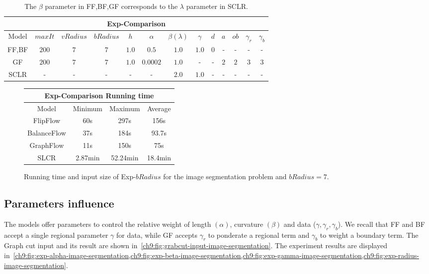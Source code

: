 \begin{table}
\small
\centering
\begin{tabular}{|c|c|c|c|c|c|c|c|c|c|c|c|c|}
\hline
\multicolumn{13}{|c|}{Exp-Comparison}\\
\hline
Model & $maxIt$ & $vRadius$ & $bRadius$ & $h$ & $\alpha$ & $\beta (\lambda)$  & $\gamma$ & $d$ & $a$ & $ob$ & $\gamma_r$ & $\gamma_b$ \\
\hline
FF,BF & $200$ & $7$ & $7$ & $1.0$ & $0.5$ & $1.0$ & $1.0$ & $0$ & - & - & - & -\\
\hline
GF & $200$ & $7$ & $7$ & $1.0$ & $0.0002$ & $1.0$ & - & - & $2$ & $2$ & $3$ & $3$\\
\hline
SCLR & - & - & - & - & - & $2.0$ & $1.0$ & - & - & - & - & -\\
\hline
\end{tabular}
\caption{ The $\beta$ parameter in FF,BF,GF corresponds to the $\lambda$ parameter in SCLR.}
\label{ch9:tab:image-segmentation-comparison-summary}
\end{table}

\begin{figure}
\center
\captionsetup{type=table}
\begin{tabular}{|c|c|c|c|}
\hline
\multicolumn{4}{|c|}{Exp-Comparison Running time}\\
\hline
Model & Minimum & Maximum & Average \\
\hline
FlipFlow & 60s & 297s & 156s\\
BalanceFlow & 37s & 184s & 93.7s\\
GraphFlow & 11s & 150s & 75s\\
SLCR & 2.87min & 52.24min & 18.4min\\
\hline
\end{tabular}
\caption{Running time and input size of Exp-$bRadius$ for the image segmentation problem and $bRadius=7$.}
\label{ch9:tab:rtime-image-segmentation-general} 
\end{figure}

\subsection{Parameters influence}
The models offer parameters to control the relative weight of length $(\alpha)$, curvature $(\beta)$ and data ($\gamma,\gamma _r, \gamma _b$). We recall that FF and BF accept a single regional parameter $\gamma$ for data, while GF accepts $\gamma _r$ to ponderate a regional term and $\gamma _b$ to weight a boundary term. The Graph cut input and its result are shown in~\cref{ch9:fig:grabcut-input-image-segmentation}. The experiment results are displayed in~\cref{ch9:fig:exp-alpha-image-segmentation,ch9:fig:exp-beta-image-segmentation,ch9:fig:exp-gamma-image-segmentation,ch9:fig:exp-radius-image-segmentation}. 

